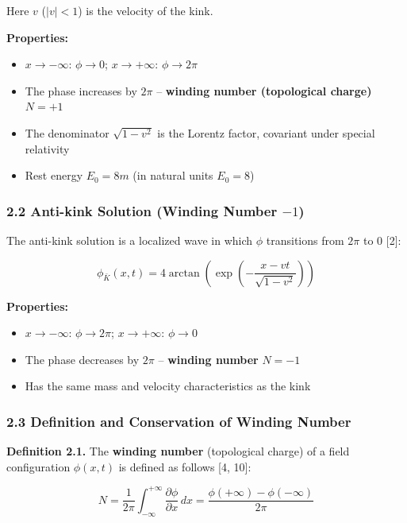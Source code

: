\documentclass[a4paper,11pt]{article}
\providecommand{\tightlist}{\setlength{\itemsep}{0pt}\setlength{\parskip}{0pt}}
\begin{document}
Here \(v\) (\(|v| < 1\)) is the velocity of the kink.

\textbf{Properties:}

\begin{itemize}
\tightlist
\item
  \(x \to -\infty\): \(\phi \to 0\); \(x \to +\infty\):
  \(\phi \to 2\pi\)
\item
  The phase increases by \(2\pi\) -- \textbf{winding number (topological
  charge)} \(N = +1\)
\item
  The denominator \(\sqrt{1 - v^2}\) is the Lorentz factor, covariant
  under special relativity
\item
  Rest energy \(E_0 = 8m\) (in natural units \(E_0 = 8\))
\end{itemize}

\subsubsection{\texorpdfstring{2.2 Anti-kink Solution (Winding Number
\(-1\))}{2.2 Anti-kink Solution (Winding Number -1)}}\label{anti-kink-solution-winding-number--1}

The anti-kink solution is a localized wave in which \(\phi\) transitions
from \(2\pi\) to \(0\) {[}2{]}:

\[\phi_{\bar{K}}(x, t) = 4\arctan\left(\exp\left(-\frac{x - vt}{\sqrt{1 - v^2}}\right)\right)\]

\textbf{Properties:}

\begin{itemize}
\tightlist
\item
  \(x \to -\infty\): \(\phi \to 2\pi\); \(x \to +\infty\):
  \(\phi \to 0\)
\item
  The phase decreases by \(2\pi\) -- \textbf{winding number} \(N = -1\)
\item
  Has the same mass and velocity characteristics as the kink
\end{itemize}

\subsubsection{2.3 Definition and Conservation of Winding
Number}\label{definition-and-conservation-of-winding-number}

\textbf{Definition 2.1.} The \textbf{winding number} (topological
charge) of a field configuration \(\phi(x, t)\) is defined as follows
{[}4, 10{]}:

\[N = \frac{1}{2\pi}\int_{-\infty}^{+\infty} \frac{\partial \phi}{\partial x}\,dx = \frac{\phi(+\infty) - \phi(-\infty)}{2\pi}\]
\end{document}

